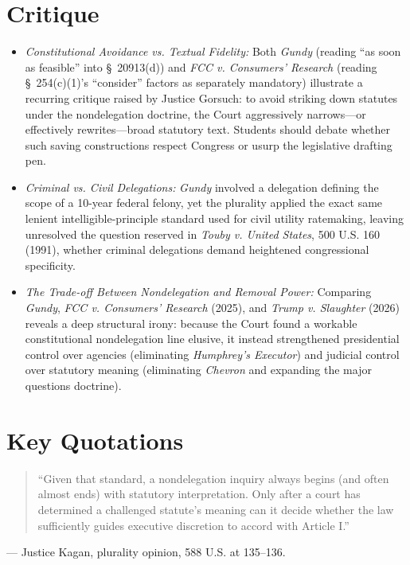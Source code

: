 \documentclass[12pt]{article}
\begin{document}
\section{Critique}
\begin{itemize}
  \item \textit{Constitutional Avoidance vs. Textual Fidelity:} Both \textit{Gundy} (reading ``as soon as feasible'' into \S~20913(d)) and \textit{FCC v. Consumers' Research} (reading \S~254(c)(1)'s ``consider'' factors as separately mandatory) illustrate a recurring critique raised by Justice Gorsuch: to avoid striking down statutes under the nondelegation doctrine, the Court aggressively narrows---or effectively rewrites---broad statutory text. Students should debate whether such saving constructions respect Congress or usurp the legislative drafting pen.
  \item \textit{Criminal vs. Civil Delegations:} \textit{Gundy} involved a delegation defining the scope of a 10-year federal felony, yet the plurality applied the exact same lenient intelligible-principle standard used for civil utility ratemaking, leaving unresolved the question reserved in \textit{Touby v. United States}, 500 U.S. 160 (1991), whether criminal delegations demand heightened congressional specificity.
  \item \textit{The Trade-off Between Nondelegation and Removal Power:} Comparing \textit{Gundy}, \textit{FCC v. Consumers' Research} (2025), and \textit{Trump v. Slaughter} (2026) reveals a deep structural irony: because the Court found a workable constitutional nondelegation line elusive, it instead strengthened presidential control over agencies (eliminating \textit{Humphrey's Executor}) and judicial control over statutory meaning (eliminating \textit{Chevron} and expanding the major questions doctrine).
\end{itemize}

\section{Key Quotations}
\begin{quote}
``Given that standard, a nondelegation inquiry always begins (and often almost ends) with statutory interpretation. Only after a court has determined a challenged statute's meaning can it decide whether the law sufficiently guides executive discretion to accord with Article I.''
\end{quote}
\noindent --- Justice Kagan, plurality opinion, 588 U.S. at 135--136.
\end{document}
